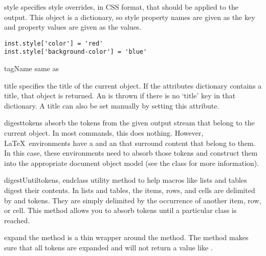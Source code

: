 \begin{memberdesc}[Macro]{style}
specifies style overrides, in CSS format, that should be applied to the
output.  This object is a dictionary, so style property names are given
as the key and property values are given as the values.
\begin{verbatim}
inst.style['color'] = 'red'
inst.style['background-color'] = 'blue'
\end{verbatim}
\end{memberdesc}

\begin{memberdesc}[Macro]{tagName}
same as 
\end{memberdesc}

\begin{memberdesc}[Macro]{title}
specifies the title of the current object.  If the attributes dictionary
contains a title, that object is returned.  An 
is thrown if there is no `title' key in that dictionary.  A title can also be 
set manually by setting this attribute.
\end{memberdesc}



\begin{methoddesc}[Macro]{digest}{tokens}
absorb the tokens from the given output stream that belong to the current
object.  In most commands, this does nothing.  However, \LaTeX\ environments
have a  and an  that surround content that belong 
to them.  In this case, these environments need to absorb those tokens 
and construct them into the appropriate document object model (see the
 class for more information).
\end{methoddesc}

\begin{methoddesc}[Macro]{digestUntil}{tokens, endclass}
utility method to help macros like lists and tables digest their contents.
In lists and tables, the items, rows, and cells are delimited by 
 and  tokens.  They are simply delimited by the
occurrence of another item, row, or cell.  This method allows you to
absorb tokens until a particular class is reached.
\end{methoddesc}

\begin{methoddesc}[Macro]{expand}{}
the  method is a thin wrapper around the 
method.  The  method makes sure that all tokens are
expanded and will not return a  value like .
\end{methoddesc}

